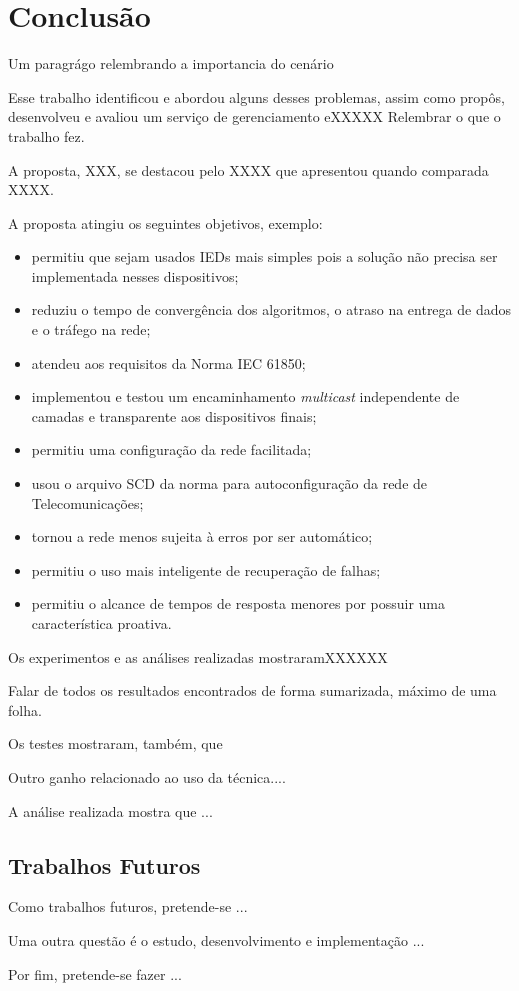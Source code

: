 \chapter{Conclusão} \label{cap:conclusao}

Um paragrágo relembrando a importancia do cenário

Esse trabalho identificou e abordou alguns desses problemas, assim como propôs, desenvolveu e avaliou um serviço de gerenciamento eXXXXX
Relembrar o que o trabalho fez.


A proposta, XXX,  se destacou pelo XXXX que apresentou quando comparada XXXX. 

A proposta atingiu os seguintes objetivos, exemplo:
\begin{itemize}
\item permitiu que sejam usados IEDs mais simples pois a solução não precisa ser implementada nesses dispositivos;
\item reduziu o tempo de convergência dos algoritmos, o atraso na entrega de dados e o tráfego na rede;
\item atendeu aos requisitos da Norma IEC 61850;
\item implementou e testou um encaminhamento \textit{multicast} independente de camadas e transparente aos dispositivos finais;
\item permitiu uma configuração da rede facilitada;
\item usou o arquivo SCD da norma para autoconfiguração da rede de Telecomunicações;
\item tornou a rede menos sujeita à erros por ser automático;
\item permitiu o uso mais inteligente de recuperação de falhas;
\item permitiu o alcance de tempos de resposta menores por possuir uma característica proativa.
\end{itemize}

Os experimentos e as análises realizadas mostraramXXXXXX

Falar de todos os resultados encontrados de forma sumarizada, máximo de uma folha.

Os testes mostraram, também, que 


Outro ganho relacionado ao uso da técnica....

A análise realizada mostra que ...

\section{Trabalhos Futuros}\label{sec:8_trabfut}

Como trabalhos futuros, pretende-se ...

Uma outra questão é o estudo, desenvolvimento e implementação ...

Por fim, pretende-se fazer ...